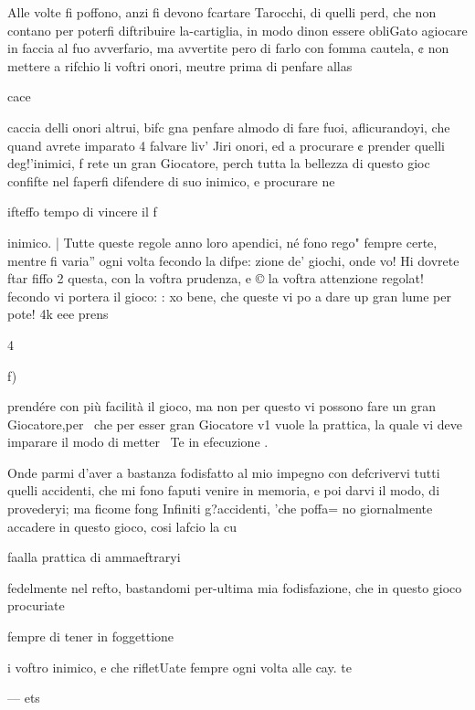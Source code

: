 \documentclass[12pt,a6paper]{article}
\begin{document}
Alle volte fi poffono, anzi fi
devono fcartare Tarocchi, di
quelli perd, che non contano
per poterfi diftribuire la-cartiglia, in modo dinon essere obliGato agiocare in faccia al fuo
avverfario, ma avvertite pero di
farlo con fomma cautela, ¢ non
mettere a rifchio li voftri onori,
meutre prima di penfare allas

cace
 

 

 

 

 

 

 

 

caccia delli onori altrui, bifc
gna penfare almodo di fare
fuoi, aflicurandoyi, che quand
avrete imparato 4 falvare liv’
Jiri onori, ed a procurare ¢
prender quelli deg!’inimici, f
rete un gran Giocatore, perch
tutta la bellezza di questo gioc
confifte nel faperfi difendere di
suo inimico, e procurare ne

ifteffo tempo di vincere il f

inimico. |
Tutte queste regole anno
loro apendici, né fono rego"
fempre certe, mentre fi varia”
ogni volta fecondo la difpe:
zione de’ giochi, onde vo! Hi
dovrete ftar fiffo 2 questa,
con la voftra prudenza, e ©
la voftra attenzione regolat!
fecondo vi portera il gioco: :
xo bene, che queste vi po a
dare up gran lume per pote! 4k
eee prens

4
 

 

f)

prendére con più facilità il gioco,
ma non per questo vi possono fare un gran Giocatore,per~
che per esser gran Giocatore v1
vuole la prattica, la quale vi deve imparare il modo di metter~
Te in efecuzione .

Onde parmi d’aver a bastanza
fodisfatto al mio impegno con
defcrivervi tutti quelli accidenti, che mi fono faputi venire in
memoria, e poi darvi il modo,
di provederyi; ma ficome fong
Infiniti g?accidenti, 'che poffa=
no giornalmente accadere in
questo gioco, cosi lafcio la cu

faalla prattica di ammaeftraryi

fedelmente nel refto, bastandomi per-ultima mia fodisfazione,
che in questo gioco procuriate

fempre di tener in foggettione

i voftro inimico, e che rifletUate fempre ogni volta alle cay.
te

— ets
 
\end{document}
